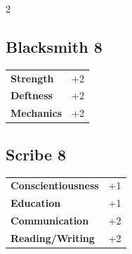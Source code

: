 \begin{multicols}{2}
\begin{tcolorbox}

\end{tcolorbox}

\begin{tcolorbox}
    \subsection*{Blacksmith \hfill \small{8 }}
    \tcblower




\begin{tabular}{@{}ll@{}}
    \textbf{Strength} & +2\\
    \textbf{Deftness} & +2\\
    \textbf{Mechanics} & +2\\
\end{tabular}


\end{tcolorbox}

\begin{tcolorbox}
    \subsection*{Scribe \hfill \small{8 }}
    \tcblower




\begin{tabular}{@{}ll@{}}
    \textbf{Conscientiousness} & +1\\
    \textbf{Education} & +1\\
    \textbf{Communication} & +2\\
    \textbf{Reading/Writing} & +2\\
\end{tabular}


\end{tcolorbox}


\end{multicols}

